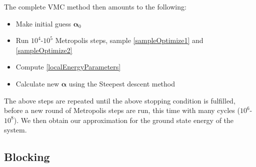 \documentclass[english, a4paper]{article}
\begin{document}
\noindent The complete VMC method then amounts to the following:
\begin{itemize}
 \item Make initial guess $\boldsymbol{\alpha}_0$
 \item Run $10^4$-$10^5$ Metropolis steps, sample \eqref{sampleOptimize1} and \eqref{sampleOptimize2}
 \item Compute \eqref{localEnergyParameters} 
 \item Calculate new $\boldsymbol{\alpha}$ using the Steepest descent method
\end{itemize}
The above steps are repeated until the above stopping condition is fulfilled, before a new round of
Metropolis steps are run, this time with many cycles ($10^6$-$10^8$). We then obtain our approximation
for the ground state energy of the system.\\


\subsection{Blocking}
\end{document}
